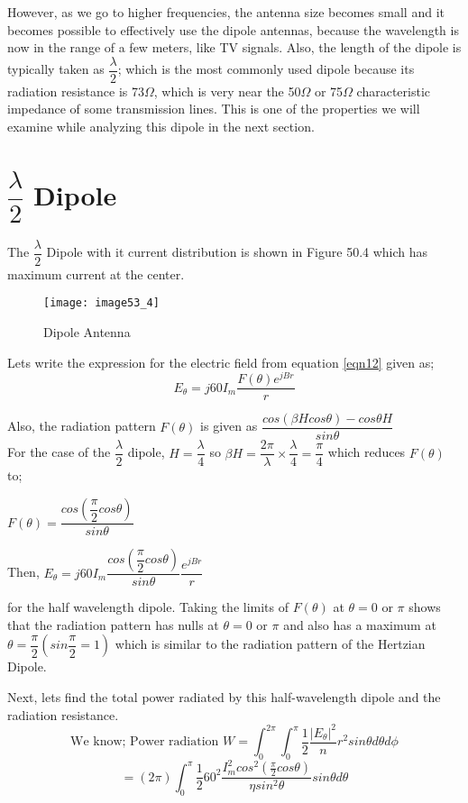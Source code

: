 However, as we go to higher frequencies, the antenna size becomes small and it becomes possible to effectively use the dipole antennas, because the wavelength is now in the range of a few meters, like TV signals. Also, the length of the dipole is typically taken as $\dfrac{\lambda}{2}$; which is the most commonly used dipole because its radiation resistance is 73$\Omega$, which is very near the 50$\Omega$ or 75$\Omega$ characteristic impedance of some transmission lines. This is one of the properties we will examine while analyzing this dipole in the next section.
\section{$\dfrac{\lambda}{2}$ Dipole}
The $\dfrac{\lambda}{2}$ Dipole with it current distribution is shown in Figure 50.4 which has maximum current at the center.
\begin{figure}
	\centering
	\texttt{[image: image53\_4]}
	\caption{Dipole Antenna}
	\label{fig:fig4}
\end{figure}
Lets write the expression for the electric field from equation \ref{eqn12} given as; 
\begin{equation*}
E_\theta = j60I_m \frac{F(\theta)e^{jBr}}{r}
\end{equation*}
\begin{center}
	Also, the radiation pattern $F(\theta)$ is given as $\dfrac{cos(\beta H cos\theta) - cos\theta H}{sin \theta}$\\
	For the case of the $\dfrac{\lambda}{2}$ dipole, $H = \dfrac{\lambda}{4}$ so $\beta H = \dfrac{2\pi}{\lambda} \times \dfrac{\lambda}{4}= \dfrac{\pi}{4} $ which reduces $F(\theta)$ to;
	
	$F(\theta) = \dfrac{cos (\dfrac{\pi}{2} cos\theta)}{sin\theta}$
	
	Then, $E_\theta = j60I_m \dfrac{cos (\dfrac{\pi}{2} cos\theta)}{sin\theta} \dfrac{e^{jBr}}{r}$ 
\end{center}for the half wavelength dipole.
Taking the limits of $F(\theta)$ at $\theta = 0$ or $\pi$ shows that the radiation pattern has nulls at $\theta = 0 \text{ or } \pi$ and also has a maximum at $\theta = \dfrac{\pi}{2} (sin \dfrac{\pi}{2} = 1)$ which is similar to the radiation pattern of the Hertzian Dipole.

Next, lets find the total power radiated by this half-wavelength dipole and the radiation resistance. 
\[ \text{We know; Power radiation } W = \int_0^{2\pi}\int_{0}^{\pi} \frac{1}{2}\frac{|E_\theta|^2}{n}r^2sin\theta d\theta d\phi \]
\[ = (2\pi)\int_{0}^{\pi} \frac{1}{2} 60^2 \frac{I_m^2cos^2(\frac{\pi}{2}cos\theta)}{\eta sin^2\theta}sin\theta d\theta \]

